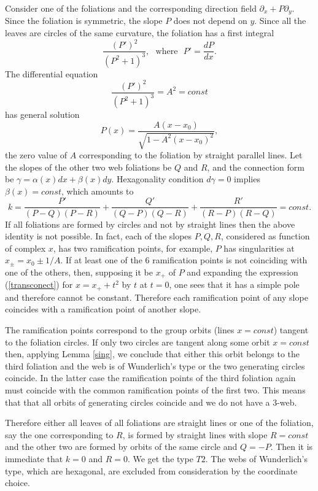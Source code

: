 \documentclass[11pt,a4paper]{article}
\begin{document}
Consider one of the foliations and the corresponding  direction field $\partial_x+P\partial_y$. Since the foliation is symmetric, the slope $P$ does not depend on $y$. Since all the leaves are circles of the same curvature, the foliation has a first integral 
$$
\frac{({P'})^2}{(P^2+1)^3},\ \ \ \mbox{where}\ \ \  P'=\frac{dP}{dx}.
$$  
The differential equation 
$$
\frac{({P'})^2}{(P^2+1)^3}=A^2=const
$$
has  general solution 
$$
P(x)=\frac{A(x-x_0)}{\sqrt{1-A^2(x-x_0)^2}},
$$
the zero value of $A$ corresponding to the foliation by straight parallel lines. 
Let  the slopes of the other two web foliations be $Q$ and $R$, and the connection form be 
$\gamma=\alpha(x)dx+\beta(x)dy$. Hexagonality condition $d\gamma=0$ implies $\beta(x)=const$, which amounts to 
\begin{equation}\label{transconect}
k=\frac{P'}{(P-Q)(P-R)}+\frac{Q'}{(Q-P)(Q-R)}+\frac{R'}{(R-P)(R-Q)}=const. 
\end{equation}
If all foliations are formed by circles and not by straight lines then the above identity is not possible. In fact, each of the slopes $P,Q,R$, considered as function of complex $x$, has two ramification points, for example, $P$ has singularities at $x_{\pm}=x_0\pm 1/A$. If at least one of the 6 ramification points is not coinciding with one of the others, then, supposing it be $x_{+}$ of $P$ and expanding the expression (\ref{transconect}) for $x=x_{+}+t^2$ by $t$ at $t=0$, one sees that it has a simple pole and therefore cannot be constant. Therefore each ramification point of any slope coincides with a ramification point of another slope.

The ramification points correspond to the group orbits (lines $x=const$) tangent to the foliation circles. If only two circles are tangent along some orbit $x=const$ then, applying Lemma \ref{sing}, we conclude that either this orbit belongs to the third foliation and the web is of Wunderlich's type or the two generating circles coincide. In the latter case the ramification points of the third foliation again must coincide with the common ramification points  of the first two. This means that that all orbits of generating circles coincide and we do not have a 3-web.      

Therefore either all leaves of all foliations are straight lines or one of the foliation, say the one corresponding to $R$, is formed by straight lines with slope $R=const$ and  the other two are formed by orbits of the same circle and $Q=-P$. Then it is immediate that $k=0$ and $R=0$. We get the type $T2$. The webs of Wunderlich's type, which are hexagonal, are excluded from consideration by the coordinate choice.  
\end{document}
